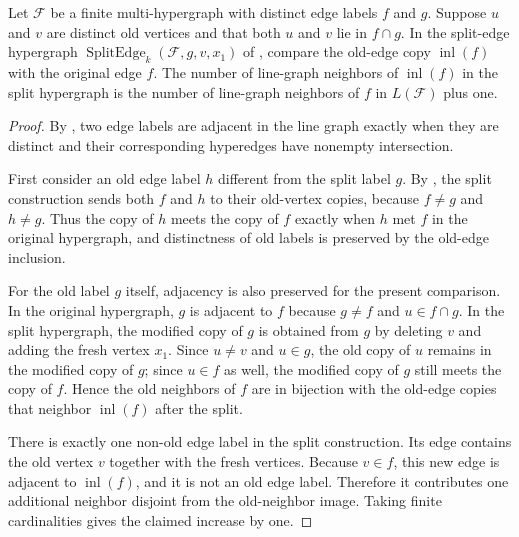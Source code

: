 \begin{helper}
Let $\mathcal F$ be a finite multi-hypergraph with distinct edge labels
$f$ and $g$.  Suppose $u$ and $v$ are distinct old vertices and that both
$u$ and $v$ lie in $f\cap g$.  In the split-edge hypergraph
$\operatorname{SplitEdge}_k(\mathcal F,g,v,x_1)$ of
, compare the old-edge copy
$\operatorname{inl}(f)$ with the original edge $f$.  The number of line-graph
neighbors of $\operatorname{inl}(f)$ in the split hypergraph is the number of
line-graph neighbors of $f$ in $L(\mathcal F)$ plus one.
\end{helper}
\begin{proof}
By , two edge labels are adjacent in the line
graph exactly when they are distinct and their corresponding hyperedges have
nonempty intersection.

First consider an old edge label $h$ different from the split label $g$.
By , the split construction sends both
$f$ and $h$ to their old-vertex copies, because $f\ne g$ and $h\ne g$.
Thus the copy of $h$ meets the copy of $f$ exactly when $h$ met $f$ in the
original hypergraph, and distinctness of old labels is preserved by the
old-edge inclusion.

For the old label $g$ itself, adjacency is also preserved for the present
comparison.  In the original hypergraph, $g$ is adjacent to $f$ because
$g\ne f$ and $u\in f\cap g$.  In the split hypergraph, the modified copy of
$g$ is obtained from $g$ by deleting $v$ and adding the fresh vertex $x_1$.
Since $u\ne v$ and $u\in g$, the old copy of $u$ remains in the modified
copy of $g$; since $u\in f$ as well, the modified copy of $g$ still meets
the copy of $f$.  Hence the old neighbors of $f$ are in bijection with the
old-edge copies that neighbor $\operatorname{inl}(f)$ after the split.

There is exactly one non-old edge label in the split construction.  Its edge
contains the old vertex $v$ together with the fresh vertices.  Because
$v\in f$, this new edge is adjacent to $\operatorname{inl}(f)$, and it is
not an old edge label.  Therefore it contributes one additional neighbor
disjoint from the old-neighbor image.  Taking finite cardinalities gives
the claimed increase by one.
\end{proof}
